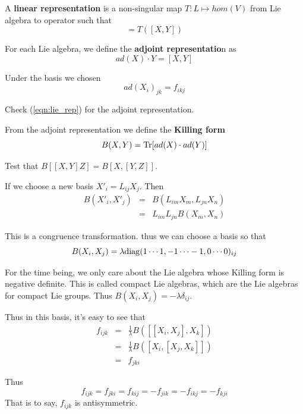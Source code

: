 \documentclass[12pt]{book}
\begin{document}
	\begin{definition}
		A {\bf linear representation} is a non-singular map $T:L\mapsto hom(V)$ from Lie algebra to operator such that
		\begin{equation}
			[T(X),T(Y)]=T([X,Y]) \label{eqn:lie_rep}
		\end{equation}
	\end{definition}
	
	
	For each Lie algebra, we define the \textbf{adjoint representatio}n as
	\begin{equation}
		ad(X)\cdot Y=[X,Y]
	\end{equation}
	
	Under the basis we chosen
	\begin{equation}
		ad(X_i)_{jk}=f_{ikj}
	\end{equation}
	
	
		Check (\ref{eqn:lie_rep}) for the adjoint representation.
	
	From the adjoint representation we define the \textbf{Killing form}
	\begin{equation}
		B(X,Y)={\rm Tr}[ad(X)\cdot ad(Y)]
	\end{equation}
	
	
		Test that $B[[X,Y]Z]=B[X,[Y,Z]]$.
	
	If we choose a new basis $X'_i=L_{ij}X_j$. Then
	\begin{eqnarray}
		B(X'_i,X'_j)&=&B(L_{im}X_m,L_{jn}X_n)\\
		&=&L_{im}L_{jn}B(X_m,X_n)
	\end{eqnarray}
	
	This is a congruence transformation. thus we can choose a basis so that
	\begin{equation} 
		B(X_i,X_j)=\lambda{\rm diag}(1\cdots 1,-1\cdots -1,0\cdots 0)_{ij}
	\end{equation}
	
	For the time being, we only care about the Lie algebra whose Killing form is negative definite. This is called compact Lie algebras, which are the Lie algebras for compact Lie groups. Thus $B(X_i,X_j)=-\lambda\delta_{ij}$.
	
	Thus in this basis, it's easy to see that
	\begin{eqnarray}
		f_{ijk}&=&\frac 1\lambda B([[X_i,X_j],X_k])\\
		&=&\frac 1\lambda B([X_i,[X_j,X_k]])\\
		&=&f_{jki}
	\end{eqnarray}
	
	Thus
	\begin{equation}
		f_{ijk}=f_{jki}=f_{kij}=-f_{jik}=-f_{ikj}=-f_{kji}
	\end{equation}	
	That is to say, $f_{ijk}$ is antisymmetric.
	
\end{document}
